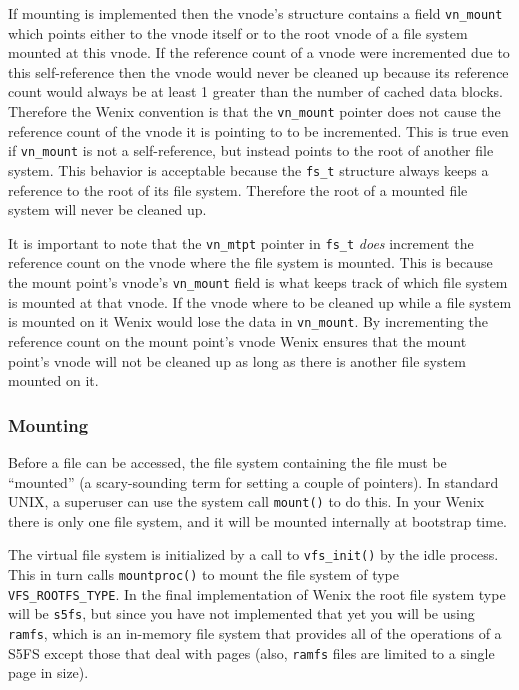 If mounting is implemented then the vnode's structure contains a field \texttt{vn\_mount} which points either to the vnode itself or to the root vnode of a file system mounted at this vnode. If the reference count of a vnode were incremented due to this self-reference then the vnode would never be cleaned up because its reference count would always be at least 1 greater than the number of cached data blocks. Therefore the Wenix convention is that the \texttt{vn\_mount} pointer does not cause the reference count of the vnode it is pointing to to be incremented. This is true even if \texttt{vn\_mount} is not a self-reference, but instead points to the root of another file system. This behavior is acceptable because the \texttt{fs\_t} structure always keeps a reference to the root of its file system. Therefore the root of a mounted file system will never be cleaned up.

It is important to note that the \texttt{vn\_mtpt} pointer in \texttt{fs\_t} \emph{does} increment the reference count on the vnode where the file system is mounted. This is because the mount point's vnode's \texttt{vn\_mount} field is what keeps track of which file system is mounted at that vnode. If the vnode where to be cleaned up while a file system is mounted on it Wenix would lose the data in \texttt{vn\_mount}. By incrementing the reference count on the mount point's vnode Wenix ensures that the mount point's vnode will not be cleaned up as long as there is another file system mounted on it.

\subsubsection{Mounting}

Before a file can be accessed, the file system containing the file must be ``mounted'' (a scary-sounding term for setting a couple of pointers). In standard UNIX, a superuser can use the system call \texttt{mount()} to do this. In your Wenix there is only one file system, and it will be mounted internally at bootstrap time.

The virtual file system is initialized by a call to \texttt{vfs\_init()} by the idle process. This in turn calls \texttt{mountproc()} to mount the file system of type \texttt{VFS\_ROOTFS\_TYPE}. In the final implementation of Wenix the root file system type will be \texttt{s5fs}, but since you have not implemented that yet you will be using \texttt{ramfs}, which is an in-memory file system that provides all of the operations of a S5FS except those that deal with pages (also, \texttt{ramfs} files are limited to a single page in size).

